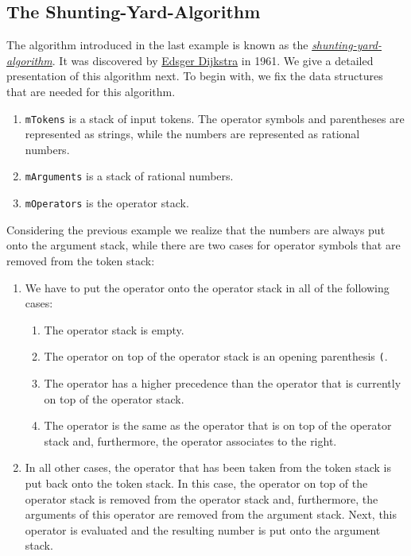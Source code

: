 \subsection{The Shunting-Yard-Algorithm \label{algo-arith}}
The algorithm introduced in the last example is known as the 
\href{http://en.wikipedia.org/wiki/Shunting-yard_algorithm}{\emph{shunting-yard-algorithm}}.
It was discovered by  \href{http://en.wikipedia.org/wiki/Edsger_Dijkstra}{Edsger Dijkstra} in 1961.
We give a detailed presentation of this algorithm next.  To begin with, we fix the data structures
that are needed for this algorithm.
\begin{enumerate}
\item \texttt{mTokens} is a stack of input tokens.  The operator symbols and parentheses are
      represented as strings, while the numbers are represented as rational numbers.
\item \texttt{mArguments} is a stack of rational numbers.  
\item \texttt{mOperators} is the operator stack.
\end{enumerate}
Considering the previous example we realize that the numbers are always put onto the argument stack,
while there are two cases for operator symbols that are removed from the token stack:
\begin{enumerate}
\item We have to put the operator onto the operator stack in all of the following cases:
      \begin{enumerate}
      \item The operator stack is empty.
      \item The operator on top of the operator stack is an opening parenthesis \texttt{(}. 
      \item The operator has a higher precedence than the operator that is currently on top of the
            operator stack.
      \item The operator is the same as the operator that is on top of the operator stack and, furthermore,
            the operator associates to the right.
      \end{enumerate}
\item In all other cases, the operator that has been taken from the token stack is put back onto the
      token stack.  In this case, the operator on top of the operator stack is removed from the
      operator stack and, furthermore, the arguments of this operator are removed from the argument
      stack.  Next, this operator is evaluated and the resulting number is put onto the argument stack.
\end{enumerate}


